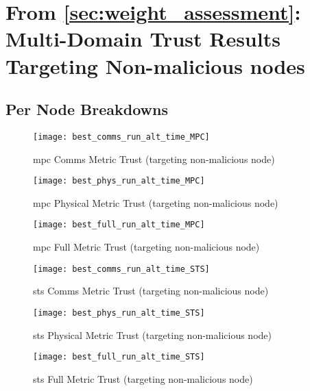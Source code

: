 \clearpage

\section{From \autoref{sec:weight_assessment}: Multi-Domain Trust Results Targeting Non-malicious nodes}

\subsection{Per Node Breakdowns}\label{sec:apx_targeting_non_malicious}
\begin{figure}[h]
  \centering
  \texttt{[image: best\_comms\_run\_alt\_time\_MPC]}
  \caption{\gls{mpc} Comms Metric Trust (targeting non-malicious node)}
  \label{fig:comms_alt_time_mpc}
\end{figure}

\begin{figure}[h]
  \centering
  \texttt{[image: best\_phys\_run\_alt\_time\_MPC]}
  \caption{\gls{mpc} Physical Metric Trust (targeting non-malicious node)}
  \label{fig:phys_alt_time_mpc}
\end{figure}

\begin{figure}[h]
  \centering
  \texttt{[image: best\_full\_run\_alt\_time\_MPC]}
  \caption{\gls{mpc} Full Metric Trust (targeting non-malicious node)}
  \label{fig:full_alt_time_mpc}
\end{figure}


\begin{figure}[h]
  \centering
  \texttt{[image: best\_comms\_run\_alt\_time\_STS]}
  \caption{\gls{sts} Comms Metric Trust (targeting non-malicious node)}
  \label{fig:comms_alt_time_sts}
\end{figure}

\begin{figure}[h]
  \centering
  \texttt{[image: best\_phys\_run\_alt\_time\_STS]}
  \caption{\gls{sts} Physical Metric Trust (targeting non-malicious node)}
  \label{fig:phys_alt_time_sts}
\end{figure}

\begin{figure}[h]
  \centering
  \texttt{[image: best\_full\_run\_alt\_time\_STS]}
  \caption{\gls{sts} Full Metric Trust (targeting non-malicious node)}
  \label{fig:full_alt_time_sts}
\end{figure}




